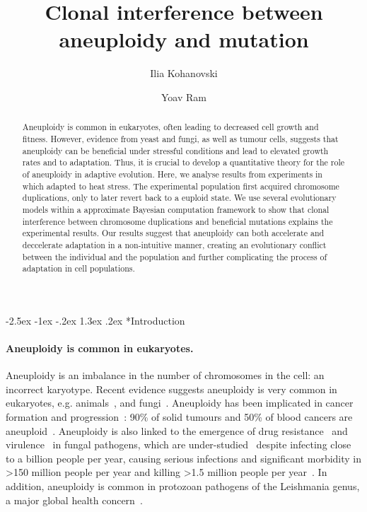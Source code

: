 \documentclass[12pt]{extarticle}
\title{Clonal interference between aneuploidy and mutation}
\author[1]{Ilia Kohanovski}
\author[1,2,*]{Yoav Ram}
\affil[1]{School of Computer Sciences, IDC Herzliya, Herzliya, Israel}
\affil[2]{School of Zoology, Faculty of Life Sciences, Tel Aviv University, Tel Aviv, Israel}
\affil[*]{Corresponding author: yoav@yoavram.com}
\makeatletter
\renewcommand\section{\@startsection {section}{1}{\z@}%
     {-2.5ex \@plus -1ex \@minus -.2ex}%
     {1.3ex \@plus.2ex}%
    {\Large\bfseries}}
\makeatother
\begin{document}
\maketitle

\begin{abstract}
Aneuploidy is common in eukaryotes, often leading to decreased cell growth and fitness. However, evidence from yeast and fungi, as well as tumour cells, suggests that aneuploidy can be beneficial under stressful conditions and  lead to elevated growth rates and to adaptation. Thus, it is crucial to develop a quantitative theory for the role of aneuploidy in adaptive evolution. Here, we analyse results from experiments in which \yeast adapted to heat stress. The experimental population first acquired chromosome duplications, only to later revert back to a euploid state. We use several evolutionary models within a approximate Bayesian computation framework to show that clonal interference between chromosome duplications and beneficial mutations explains the experimental results. Our results suggest that aneuploidy can both accelerate and deccelerate adaptation in a non-intuitive manner, creating an evolutionary conflict between the individual and the population and further complicating the process of adaptation in cell populations.
\end{abstract}

\pagebreak
\section*{Introduction}

\paragraph*{Aneuploidy is common in eukaryotes.}
Aneuploidy is an imbalance in the number of chromosomes in the cell: an incorrect karyotype.
Recent evidence suggests aneuploidy is very common in eukaryotes, e.g. animals~\citep{Santaguida2015review, Naylor2016, Bakhoum2017}, and fungi~\citep{Pavelka2010, Zhu2016, Robbins2017, Todd2017}.
Aneuploidy has been implicated in cancer formation and progression~\citep{Boveri2008, Schvartzman2010}: 
90\% of solid tumours and 50\% of blood cancers are aneuploid~\citep{Santaguida2015review}.
Aneuploidy is also linked to the emergence of drug resistance~\citep{Selmecki2009} and virulence~\citep{Moller2018} in fungal pathogens, which are under-studied~\citep{Rodrigues2018} despite infecting close to a billion people per year, causing serious infections and significant morbidity in >150 million people per year and killing >1.5 million people per year~\citep{Selmecki2009, Rodrigues2018}.
In addition, aneuploidy is common in protozoan pathogens of the Leishmania genus, a major global health concern~\citep{Mannaert2012}.
\end{document}
